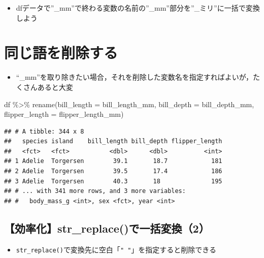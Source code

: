 \documentclass[
  xelatex,ja=standard, b5paper]{bxjsbook}
\newenvironment{Shaded}{\begin{snugshade}}{\end{snugshade}}
\newcommand{\AttributeTok}[1]{\textcolor[rgb]{0.77,0.63,0.00}{#1}}
\newcommand{\FunctionTok}[1]{\textcolor[rgb]{0.00,0.00,0.00}{#1}}
\newcommand{\NormalTok}[1]{#1}
\newcommand{\SpecialCharTok}[1]{\textcolor[rgb]{0.00,0.00,0.00}{#1}}
\providecommand{\tightlist}{%
  \setlength{\itemsep}{0pt}\setlength{\parskip}{0pt}}
\begin{document}
\begin{itemize}
\tightlist
\item
  dfデータで''\_mm''で終わる変数の名前の''\_mm''部分を''\_ミリ''に一括で変換しよう
\end{itemize}

\hypertarget{rename-remove}{%
\section{同じ語を削除する}\label{rename-remove}}

\begin{itemize}
\tightlist
\item
  ``\_mm''を取り除きたい場合，それを削除した変数名を指定すればよいが，たくさんあると大変
\end{itemize}

\begin{Shaded}
\begin{Highlighting}[]
\NormalTok{df }\SpecialCharTok{\%\textgreater{}\%} 
  \FunctionTok{rename}\NormalTok{(}\AttributeTok{bill\_length =}\NormalTok{ bill\_length\_mm,}
         \AttributeTok{bill\_depth  =}\NormalTok{ bill\_depth\_mm,}
         \AttributeTok{flipper\_length =}\NormalTok{ flipper\_length\_mm)}
\end{Highlighting}
\end{Shaded}

\begin{verbatim}
## # A tibble: 344 x 8
##   species island    bill_length bill_depth flipper_length
##   <fct>   <fct>           <dbl>      <dbl>          <int>
## 1 Adelie  Torgersen        39.1       18.7            181
## 2 Adelie  Torgersen        39.5       17.4            186
## 3 Adelie  Torgersen        40.3       18              195
## # ... with 341 more rows, and 3 more variables:
## #   body_mass_g <int>, sex <fct>, year <int>
\end{verbatim}

\hypertarget{rename-strreplace2}{%
\subsection{【効率化】str\_replace()で一括変換（2）}\label{rename-strreplace2}}

\begin{itemize}
\tightlist
\item
  \texttt{str\_replace()}で変換先に空白「\texttt{"\ "}」を指定すると削除できる
\end{itemize}
\end{document}
